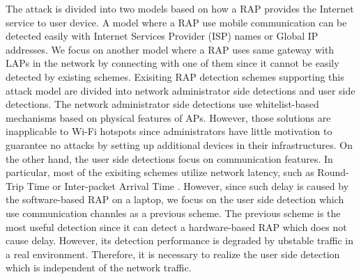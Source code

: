 \documentclass[conference]{IEEEtran}
\begin{document}
The attack is divided into two models based on how a RAP provides the Internet service to user device.
A model where a RAP use mobile communication can be detected easily with Internet Services Provider (ISP) names or Global IP addresses\cite{rtt}.
We focus on another model where a RAP uses same gateway with LAPs in the network by connecting with one of them since it cannot be easily detected by existing schemes.
Exisiting RAP detection schemes supporting this attack model are divided into network administrator side detections and user side detections.
The network administrator side detections use whitelist-based mechanisms based on physical features of APs\cite{prapd}\cite{clockskew}.
However, those solutions are inapplicable to Wi-Fi hotspots since administrators have little motivation to guarantee no attacks by setting up additional devices in their infrastructures.
On the other hand, the user side detections focus on communication features.
In particular, most of the exisiting schemes utilize network latency, such as Round-Trip Time or Inter-packet Arrival Time \cite{rtt}\cite{iat}.
However, since such delay is caused by the software-based RAP on a laptop, we focus on the user side detection which use communication channles as a previous scheme\cite{previous}.
The previous scheme is the most useful detection since it can detect a hardware-based RAP which does not cause delay.
However, its detection performance is degraded by ubstable traffic in a real environment.
Therefore, it is necessary to realize the user side detection which is independent of the network traffic.
\end{document}
